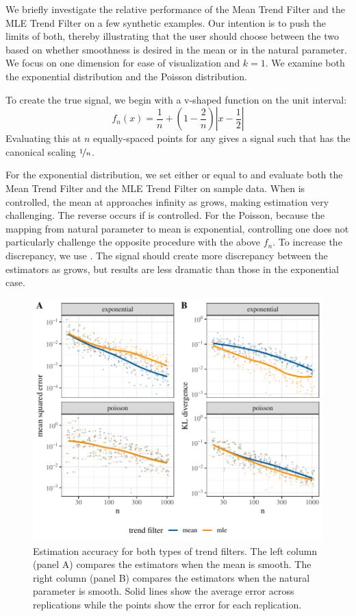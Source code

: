 \documentclass[ejs,noshowframe]{imsart}
\theoremstyle{plain}
\theoremstyle{definition}
\newcommand{\snorm}[1]{\lVert #1 \rVert}
\begin{document}
We briefly investigate the relative performance of the Mean Trend Filter and the
MLE Trend Filter on a few synthetic examples. Our intention is to push the
limits of both, thereby illustrating that the user should choose between the two
based on whether smoothness is desired in the mean or in the natural parameter.
We focus on one dimension for ease of visualization and $k = 1$. We examine both
the exponential distribution and the Poisson distribution.

To create the true signal, we begin with a v-shaped function on the unit
interval:
\[
f_n(x) = \frac 1n + \left( 1 - \frac 2n \right) \left| x - \frac 12\right|
\]
Evaluating this at $n$ equally-spaced points for any  gives a signal 
such that
\smash{$\snorm{Df_n(x)}_1$} has the canonical scaling $\nicefrac{1}{n}$.

For the exponential distribution, we set either \smash{$\theta^*$} or 
\smash{$\beta^*$} equal to
 and evaluate both the Mean Trend Filter and the MLE Trend 
Filter on
sample data. When \smash{$\theta^*$} is controlled, the mean at  
approaches
infinity as  grows, making estimation very challenging. The reverse 
occurs
if \smash{$\beta^*$} is controlled. For the Poisson, because the mapping 
from natural parameter to mean is exponential, controlling one does not 
particularly
challenge the opposite procedure with the above $f_n$. To increase the 
discrepancy, we 
use 
. The signal should create more 
discrepancy between the
estimators as  grows, but results are less dramatic than those in 
the 
exponential case.

\begin{figure}[t]
  \centering
  \includegraphics[width=.9\textwidth]{sim-errors.pdf}
  \caption{Estimation accuracy for both types of trend filters. The left column
    (panel A) compares the estimators when the mean is smooth. The right column
    (panel B) compares the estimators when the natural parameter is smooth.
    Solid lines show the average error across replications while the points show
    the error for each replication.}
  \label{fig:sim-errors}
\end{figure}
\end{document}
